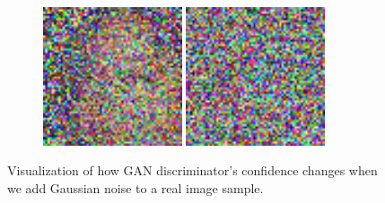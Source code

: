 \begin{figure}[h]
\begin{subfigure}[b]{0.5\textwidth}
		\includegraphics[width=0.45\textwidth]{figures/diversity_gan2_real_dis_real_imgs_var50}
		\includegraphics[width=0.45\textwidth]{figures/diversity_gan2_real_dis_real_imgs_var100}
	\end{subfigure}
	\caption{Visualization of how GAN discriminator's confidence changes when we add Gaussian noise to a real image sample.}
	\label{fig:changed_real_image_real_dis}
\end{figure}

